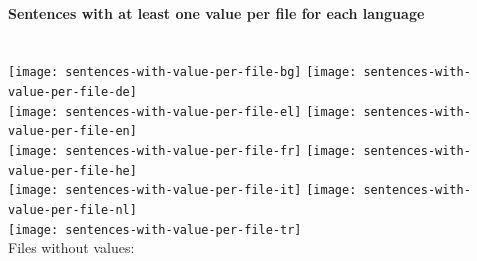 \documentclass[a4paper]{article}
\newenvironment{figures}[1]{\noindent\begin{minipage}{\linewidth}\paragraph{#1}\noindent\\[\baselineskip]}{\end{minipage}\\[4ex]}
\begin{document}
\begin{figures}{Sentences with at least one value per file for each language}
\texttt{[image: sentences-with-value-per-file-bg]}%
\hfill%
\texttt{[image: sentences-with-value-per-file-de]}\\[4ex]
\texttt{[image: sentences-with-value-per-file-el]}%
\hfill%
\texttt{[image: sentences-with-value-per-file-en]}\\[4ex]
\texttt{[image: sentences-with-value-per-file-fr]}%
\hfill%
\texttt{[image: sentences-with-value-per-file-he]}\\[4ex]
\texttt{[image: sentences-with-value-per-file-it]}%
\hfill%
\texttt{[image: sentences-with-value-per-file-nl]}\\[4ex]
\texttt{[image: sentences-with-value-per-file-tr]}\\

\noindent
Files without values: 
\end{figures}
\end{document}
